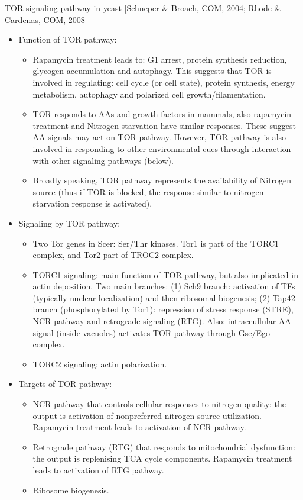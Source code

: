 \documentclass{report}
\begin{document}
TOR signaling pathway in yeast [Schneper \& Broach, COM, 2004; Rhode \& Cardenas, COM, 2008]
\begin{itemize}
\item Function of TOR pathway: 
\begin{itemize}
	\item Rapamycin treatment leads to: G1 arrest, protein synthesis reduction, glycogen accumulation and autophagy. This suggests that TOR is involved in regulating: cell cycle (or cell state), protein synthesis, energy metabolism, autophagy and polarized cell growth/filamentation. 
	\item TOR responds to AAs and growth factors in mammals, also rapamycin treatment and Nitrogen starvation have similar responses. These suggest AA signals may act on TOR pathway. However, TOR pathway is also involved in responding to other environmental cues through interaction with other signaling pathways (below). 
	\item Broadly speaking, TOR pathway represents the availability of Nitrogen source (thus if TOR is blocked, the response similar to nitrogen starvation response is activated). 
\end{itemize}

\item Signaling by TOR pathway: 
\begin{itemize}
	\item Two Tor genes in Scer: Ser/Thr kinases. Tor1 is part of the TORC1 complex, and Tor2 part of TROC2 complex. 
	\item TORC1 signaling: main function of TOR pathway, but also implicated in actin deposition. Two main branches: (1) Sch9 branch: activation of TFs (typically nuclear localization) and then ribosomal biogenesis; (2) Tap42 branch (phosphorylated by Tor1): repression of stress response (STRE), NCR pathway and retrograde signaling (RTG). Also: intraceullular AA signal (inside vacuoles) activates TOR pathway through Gse/Ego complex. 
	\item TORC2 signaling: actin polarization. 
\end{itemize}

\item Targets of TOR pathway: 
\begin{itemize}
	\item NCR pathway that controls cellular responses to nitrogen quality: the output is activation of nonpreferred nitrogen source utilization. Rapamycin treatment leads to activation of NCR pathway. 
	\item Retrograde pathway (RTG) that responds to mitochondrial dysfunction: the output is replenising TCA cycle components. Rapamycin treatment leads to activation of RTG pathway. 
	\item Ribosome biogenesis. 
\end{itemize}


\end{itemize}
\end{document}
